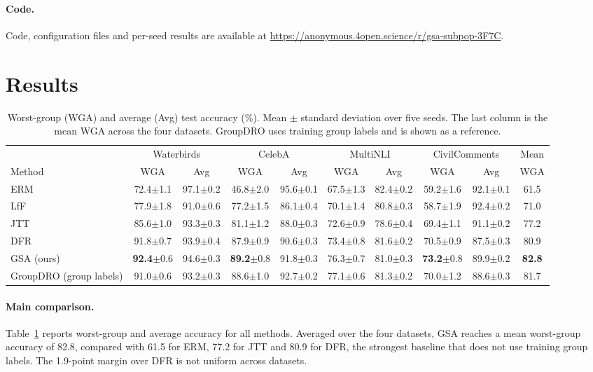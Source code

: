 \documentclass{article}
\begin{document}
\paragraph{Code.}
Code, configuration files and per-seed results are available at \url{https://anonymous.4open.science/r/gsa-subpop-3F7C}.

\section{Results}
\label{sec:results}

\begin{table}[t]
\centering
\caption{Worst-group (WGA) and average (Avg) test accuracy (\%). Mean $\pm$ standard deviation over five seeds. The last column is the mean WGA across the four datasets. GroupDRO uses training group labels and is shown as a reference.}
\label{tab:main}
\small
\begin{tabular}{lccccccccc}
\toprule
 & \multicolumn{2}{c}{Waterbirds} & \multicolumn{2}{c}{CelebA} & \multicolumn{2}{c}{MultiNLI} & \multicolumn{2}{c}{CivilComments} & Mean \\
Method & WGA & Avg & WGA & Avg & WGA & Avg & WGA & Avg & WGA \\
\midrule
ERM & 72.4$\pm$1.1 & 97.1$\pm$0.2 & 46.8$\pm$2.0 & 95.6$\pm$0.1 & 67.5$\pm$1.3 & 82.4$\pm$0.2 & 59.2$\pm$1.6 & 92.1$\pm$0.1 & 61.5 \\
LfF & 77.9$\pm$1.8 & 91.0$\pm$0.6 & 77.2$\pm$1.5 & 86.1$\pm$0.4 & 70.1$\pm$1.4 & 80.8$\pm$0.3 & 58.7$\pm$1.9 & 92.4$\pm$0.2 & 71.0 \\
JTT & 85.6$\pm$1.0 & 93.3$\pm$0.3 & 81.1$\pm$1.2 & 88.0$\pm$0.3 & 72.6$\pm$0.9 & 78.6$\pm$0.4 & 69.4$\pm$1.1 & 91.1$\pm$0.2 & 77.2 \\
DFR & 91.8$\pm$0.7 & 93.9$\pm$0.4 & 87.9$\pm$0.9 & 90.6$\pm$0.3 & 73.4$\pm$0.8 & 81.6$\pm$0.2 & 70.5$\pm$0.9 & 87.5$\pm$0.3 & 80.9 \\
GSA (ours) & \textbf{92.4}$\pm$0.6 & 94.6$\pm$0.3 & \textbf{89.2}$\pm$0.8 & 91.8$\pm$0.3 & 76.3$\pm$0.7 & 81.0$\pm$0.3 & \textbf{73.2}$\pm$0.8 & 89.9$\pm$0.2 & \textbf{82.8} \\
\midrule
GroupDRO (group labels) & 91.0$\pm$0.6 & 93.2$\pm$0.3 & 88.6$\pm$1.0 & 92.7$\pm$0.2 & 77.1$\pm$0.6 & 81.3$\pm$0.2 & 70.0$\pm$1.2 & 88.6$\pm$0.3 & 81.7 \\
\bottomrule
\end{tabular}
\end{table}

\paragraph{Main comparison.}
Table~\ref{tab:main} reports worst-group and average accuracy for all methods. Averaged over the four datasets, GSA reaches a mean worst-group accuracy of 82.8, compared with 61.5 for ERM, 77.2 for JTT and 80.9 for DFR, the strongest baseline that does not use training group labels. The 1.9-point margin over DFR is not uniform across datasets.
\end{document}
